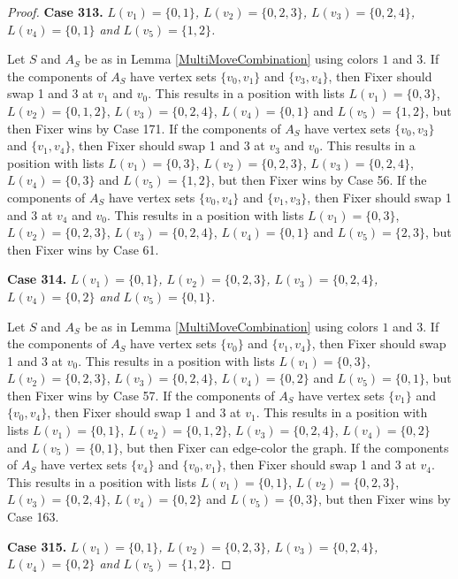\documentclass[12pt]{amsart}
\theoremstyle{plain}
\theoremstyle{definition}
\theoremstyle{remark}
\begin{document}
\begin{proof}
\noindent\textbf{Case 313.  }\textit{$L(v_1) = \{0, 1\}$, $L(v_2) = \{0, 2, 3\}$, $L(v_3) = \{0, 2, 4\}$, $L(v_4) = \{0, 1\}$ and $L(v_5) = \{1, 2\}$.}

Let $S$ and $A_S$ be as in Lemma \ref{MultiMoveCombination} using colors $1$ and $3$. If the components of $A_S$ have vertex sets $\{v_0, v_1\}$ and $\{v_3, v_4\}$, then Fixer should swap 1 and 3 at $v_1$ and $v_0$. This results in a position with lists $L(v_1) = \{0, 3\}$, $L(v_2) = \{0, 1, 2\}$, $L(v_3) = \{0, 2, 4\}$, $L(v_4) = \{0, 1\}$ and $L(v_5) = \{1, 2\}$, but then Fixer wins by Case 171. If the components of $A_S$ have vertex sets $\{v_0, v_3\}$ and $\{v_1, v_4\}$, then Fixer should swap 1 and 3 at $v_3$ and $v_0$. This results in a position with lists $L(v_1) = \{0, 3\}$, $L(v_2) = \{0, 2, 3\}$, $L(v_3) = \{0, 2, 4\}$, $L(v_4) = \{0, 3\}$ and $L(v_5) = \{1, 2\}$, but then Fixer wins by Case 56. If the components of $A_S$ have vertex sets $\{v_0, v_4\}$ and $\{v_1, v_3\}$, then Fixer should swap 1 and 3 at $v_4$ and $v_0$. This results in a position with lists $L(v_1) = \{0, 3\}$, $L(v_2) = \{0, 2, 3\}$, $L(v_3) = \{0, 2, 4\}$, $L(v_4) = \{0, 1\}$ and $L(v_5) = \{2, 3\}$, but then Fixer wins by Case 61. 

\noindent\textbf{Case 314.  }\textit{$L(v_1) = \{0, 1\}$, $L(v_2) = \{0, 2, 3\}$, $L(v_3) = \{0, 2, 4\}$, $L(v_4) = \{0, 2\}$ and $L(v_5) = \{0, 1\}$.}

Let $S$ and $A_S$ be as in Lemma \ref{MultiMoveCombination} using colors $1$ and $3$. If the components of $A_S$ have vertex sets $\{v_0\}$ and $\{v_1, v_4\}$, then Fixer should swap 1 and 3 at $v_0$. This results in a position with lists $L(v_1) = \{0, 3\}$, $L(v_2) = \{0, 2, 3\}$, $L(v_3) = \{0, 2, 4\}$, $L(v_4) = \{0, 2\}$ and $L(v_5) = \{0, 1\}$, but then Fixer wins by Case 57. If the components of $A_S$ have vertex sets $\{v_1\}$ and $\{v_0, v_4\}$, then Fixer should swap 1 and 3 at $v_1$. This results in a position with lists $L(v_1) = \{0, 1\}$, $L(v_2) = \{0, 1, 2\}$, $L(v_3) = \{0, 2, 4\}$, $L(v_4) = \{0, 2\}$ and $L(v_5) = \{0, 1\}$, but then Fixer can edge-color the graph. If the components of $A_S$ have vertex sets $\{v_4\}$ and $\{v_0, v_1\}$, then Fixer should swap 1 and 3 at $v_4$. This results in a position with lists $L(v_1) = \{0, 1\}$, $L(v_2) = \{0, 2, 3\}$, $L(v_3) = \{0, 2, 4\}$, $L(v_4) = \{0, 2\}$ and $L(v_5) = \{0, 3\}$, but then Fixer wins by Case 163. 

\noindent\textbf{Case 315.  }\textit{$L(v_1) = \{0, 1\}$, $L(v_2) = \{0, 2, 3\}$, $L(v_3) = \{0, 2, 4\}$, $L(v_4) = \{0, 2\}$ and $L(v_5) = \{1, 2\}$.}


\end{proof}
\end{document}
